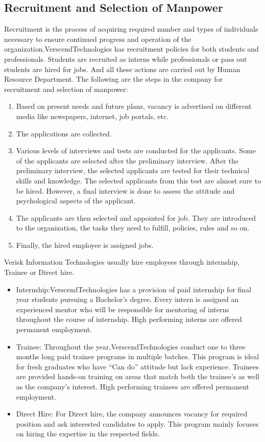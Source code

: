 \subsection{Recruitment and Selection of Manpower}
Recruitment is the process of acquiring required number and types of individuals necessary to ensure
continued progress and operation of the organization.VerscendTechnologies has recruitment
policies for both students and professionals. Students are recruited as interns while professionals or pass out
students are hired for jobs. And all these actions are carried out by Human Resource Department. The
following are the steps in the company for recruitment and selection of manpower:
\begin{enumerate}
\item  Based on present needs and future plans, vacancy is advertised on different media like newspapers,
internet, job portals, etc.
\item  The applications are collected.
\item  Various levels of interviews and tests are conducted for the applicants. Some of the applicants are
selected after the preliminary interview. After the preliminary interview, the selected applicants are
tested for their technical skills and knowledge. The selected applicants from this test are almost sure
to be hired. However, a final interview is done to assess the attitude and psychological aspects of
the applicant.
\item  The applicants are then selected and appointed for job. They are introduced to the organization, the
tasks they need to fulfill, policies, rules and so on.
\item  Finally, the hired employee is assigned jobs.
\end{enumerate}
Verisk Information Technologies usually hire employees through internship, Trainee or Direct hire.
\begin{itemize}
\item Internship:VerscendTechnologies has a provision of paid internship for final year students
pursuing a Bachelor's degree. Every intern is assigned an experienced mentor who will be responsible
for mentoring of interns throughout the course of internship. High performing interns are offered
permanent employment.

\item Trainee: Throughout the year,VerscendTechnologies conduct one to three months long
paid trainee programs in multiple batches. This program is ideal for fresh graduates who have “Can
do” attitude but lack experience. Trainees are provided hands-on training on areas that match both the
trainee’s as well as the company’s interest. High performing trainees are offered permanent
employment.

\item Direct Hire: For Direct hire, the company announces vacancy for required position and ask interested
candidates to apply. This program mainly focuses on hiring the expertise in the respected fields.
\end{itemize}
